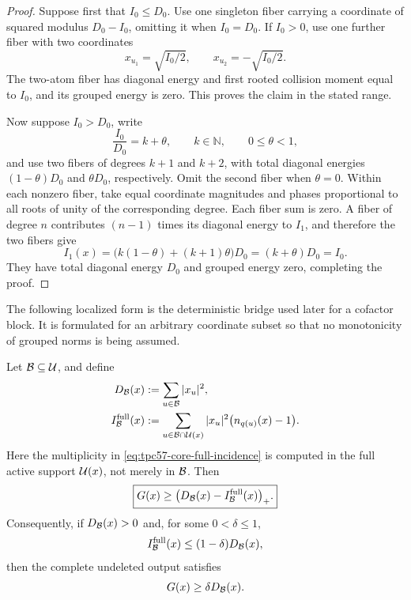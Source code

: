 \begin{proof}
Suppose first that \(I_0\le D_0\).  Use one singleton fiber carrying a
coordinate of squared modulus \(D_0-I_0\), omitting it when
\(I_0=D_0\).  If \(I_0>0\), use one further fiber with two coordinates
\[
 x_{u_1}=\sqrt{I_0/2},
 \qquad
 x_{u_2}=-\sqrt{I_0/2}.
\]
The two-atom fiber has diagonal energy and first rooted collision moment
equal to \(I_0\), and its grouped energy is zero.  This proves the claim in
the stated range.

Now suppose \(I_0>D_0\), write
\[
 \frac{I_0}{D_0}=k+\theta,
 \qquad k\in\mathbb N,
 \qquad 0\le\theta<1,
\]
and use two fibers of degrees \(k+1\) and \(k+2\), with total diagonal
energies \((1-\theta)D_0\) and \(\theta D_0\), respectively.  Omit the
second fiber when \(\theta=0\).  Within each nonzero fiber, take equal
coordinate magnitudes and phases proportional to all roots of unity of
the corresponding degree.  Each fiber sum is zero.  A fiber of degree
\(n\) contributes \((n-1)\) times its diagonal energy to \(I_1\), and
therefore the two fibers give
\[
 I_1(x)
 =\bigl(k(1-\theta)+(k+1)\theta\bigr)D_0
 =(k+\theta)D_0
 =I_0.
\]
They have total diagonal energy \(D_0\) and grouped energy zero, completing
the proof.
\end{proof}

The following localized form is the deterministic bridge used later for a
cofactor block.  It is formulated for an arbitrary coordinate subset so
that no monotonicity of grouped norms is being assumed.

\begin{proposition}
\label{prop:tpc57-core-to-full-bridge}
Let \(\mathcal B\subseteq\mathcal U\), and define
\begin{align}
 D_{\mathcal B}(x)
 &:=\sum_{u\in\mathcal B}|x_u|^2,
 \label{eq:tpc57-core-energy}\\
 I_{\mathcal B}^{\rm full}(x)
 &:=\sum_{u\in\mathcal B\cap\mathcal U(x)}|x_u|^2
       \bigl(n_{q(u)}(x)-1\bigr).
 \label{eq:tpc57-core-full-incidence}
\end{align}
Here the multiplicity in \eqref{eq:tpc57-core-full-incidence} is computed
in the full active support \(\mathcal U(x)\), not merely in \(\mathcal B\).  Then
\begin{equation}
 \boxed{
 G(x)\ge
 \bigl(D_{\mathcal B}(x)-I_{\mathcal B}^{\rm full}(x)\bigr)_+.}
 \label{eq:tpc57-core-full-floor}
\end{equation}
Consequently, if \(D_{\mathcal B}(x)>0\) and, for some \(0<\delta\le1\),
\begin{equation}
 I_{\mathcal B}^{\rm full}(x)
 \le(1-\delta)D_{\mathcal B}(x),
 \label{eq:tpc57-undeleted-incidence-criterion}
\end{equation}
then the complete undeleted output satisfies
\begin{equation}
 G(x)\ge\delta D_{\mathcal B}(x).
 \label{eq:tpc57-undeleted-positive-criterion}
\end{equation}
\end{proposition}

